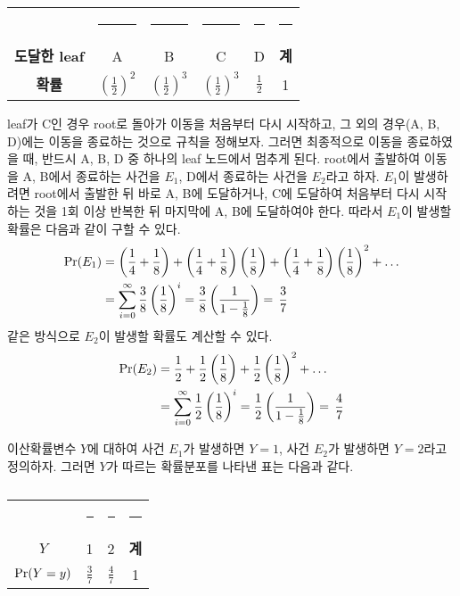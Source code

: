 \documentclass[11pt]{article}
\begin{document}
\begin{table}[h]
\centering
\begin{tabular}{cccccc}
\toprule
 & \rule{1cm}{0pt} & \rule{1cm}{0pt} & \rule{1cm}{0pt} & \rule{1cm}{0pt} & \rule{0.5cm}{0pt} \\[-\arraystretch\normalbaselineskip]
\textbf{도달한 leaf} & A & B & C & D & \textbf{계} \\
\midrule
\textbf{확률} & $\displaystyle \left(\frac{1}{2}\right)^2$ & $\displaystyle \left(\frac{1}{2}\right)^3$ & $\displaystyle \left(\frac{1}{2}\right)^3$ & $\displaystyle \frac{1}{2}$ & 1 \\
\bottomrule
\end{tabular}
\caption{}
\label{tab01}
\end{table}
 leaf가 C인 경우 root로 돌아가 이동을 처음부터 다시 시작하고, 그 외의 경우(A, B, D)에는 이동을 종료하는 것으로 규칙을 정해보자. 그러면 최종적으로 이동을 종료하였을 때, 반드시 A, B, D 중 하나의 leaf 노드에서 멈추게 된다. root에서 출발하여 이동을 A, B에서 종료하는 사건을 ${E}_{1}$, D에서 종료하는 사건을 ${E}_{2}$라고 하자. ${E}_{1}$이 발생하려면 root에서 출발한 뒤 바로 A, B에 도달하거나, C에 도달하여 처음부터 다시 시작하는 것을 1회 이상 반복한 뒤 마지막에 A, B에 도달하여야 한다. 따라서 ${E}_{1}$이 발생할 확률은 다음과 같이 구할 수 있다.
\[
\begin{split}
\textnormal{Pr}(E_{1}) & = \left(\frac{1}{4} + \frac{1}{8}\right)
+ \left(\frac{1}{4} + \frac{1}{8}\right)\left(\frac{1}{8}\right)
+ \left(\frac{1}{4} + \frac{1}{8}\right)\left(\frac{1}{8}\right)^2 + \ldots \\
& = \sum_{i=0}^{\infty} \frac{3}{8}\left(\frac{1}{8}\right)^i = \frac{3}{8}\left(\frac{1}{1 - \frac{1}{8}}\right) = \,\frac{3}{7}
\end{split}
\]
같은 방식으로 ${E}_{2}$이 발생할 확률도 계산할 수 있다.
\[
\begin{split}
\textnormal{Pr}(E_{2}) & = \frac{1}{2}
+ \frac{1}{2}\left(\frac{1}{8}\right)
+ \frac{1}{2}\left(\frac{1}{8}\right)^2 + \ldots \\
& = \sum_{i=0}^{\infty} \frac{1}{2}\left(\frac{1}{8}\right)^i = \frac{1}{2}\left(\frac{1}{1 - \frac{1}{8}}\right) = \,\frac{4}{7}
\end{split}
\]

이산확률변수 $Y$에 대하여 사건 $E_{1}$가 발생하면 $Y=1$, 사건 $E_{2}$가 발생하면 $Y=2$라고 정의하자. 그러면 $Y$가 따르는 확률분포를 나타낸 표는 다음과 같다.

\begin{table}[h]
\centering
\begin{tabular}{cccc}
\toprule
 & \rule{0.8cm}{0pt} & \rule{0.8cm}{0pt} & \rule{0.4cm}{0pt} \\[-\arraystretch\normalbaselineskip]
$Y$ & 1 & 2 & \textbf{계} \\
\midrule
$\textnormal{Pr}(Y=y)$ & $\displaystyle \frac{3}{7}$ & $\displaystyle \frac{4}{7}$ & 1 \\
\bottomrule
\end{tabular}
\caption{}
\label{tab02}
\end{table}
\end{document}
